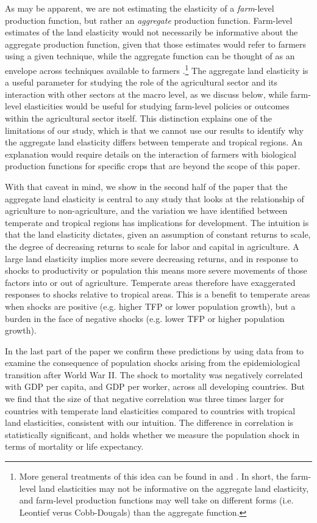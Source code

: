 \documentclass[12pt]{article}
\begin{document}
As may be apparent, we are not estimating the elasticity of a \textit{farm}-level production function, but rather an \textit{aggregate} production function. Farm-level estimates of the land elasticity would not necessarily be informative about the aggregate production function, given that those estimates would refer to farmers using a given technique, while the aggregate function can be thought of as an envelope across techniques available to farmers \citep{Hayami:1970ly}.\footnote{More general treatments of this idea can be found in \citet{houthakker1955} and \citet{jones2005}. In short, the farm-level land elasticities may not be informative on the aggregate land elasticity, and farm-level production functions may well take on different forms (i.e. Leontief verus Cobb-Dougals) than the aggregate function.} The aggregate land elasticity is a useful parameter for studying the role of the agricultural sector and its interaction with other sectors at the macro level, as we discuss below, while farm-level elasticities would be useful for studying farm-level policies or outcomes within the agricultural sector itself. This distinction explains one of the limitations of our study, which is that we cannot use our results to identify why the aggregate land elasticity differs between temperate and tropical regions. An explanation would require details on the interaction of farmers with biological production functions for specific crops that are beyond the scope of this paper. 

With that caveat in mind, we show in the second half of the paper that the aggregate land elasticity is central to any study that looks at the relationship of agriculture to non-agriculture, and the variation we have identified between temperate and tropical regions has implications for development. The intuition is that the land elasticity dictates, given an assumption of constant returns to scale, the degree of decreasing returns to scale for labor and capital in agriculture. A large land elasticity implies more severe decreasing returns, and in response to shocks to productivity or population this means more severe movements of those factors into or out of agriculture. Temperate areas therefore have exaggerated responses to shocks relative to tropical areas. This is a benefit to temperate areas when shocks are positive (e.g. higher TFP or lower population growth), but a burden in the face of negative shocks (e.g. lower TFP or higher population growth).

In the last part of the paper we confirm these predictions by using data from \cite{aj07} to examine the consequence of population shocks arising from the epidemiological transition after World War II. The shock to mortality was negatively correlated with GDP per capita, and GDP per worker, across all developing countries. But we find that the size of that negative correlation was three times larger for countries with temperate land elasticities compared to countries with tropical land elasticities, consistent with our intuition. The difference in correlation is statistically significant, and holds whether we measure the population shock in terms of mortality or life expectancy.
\end{document}
